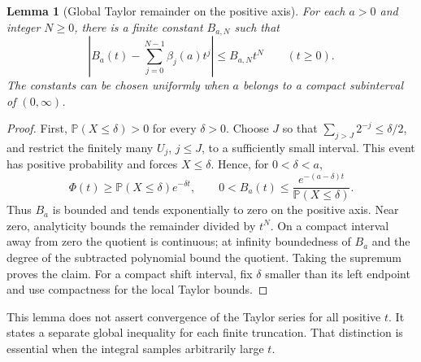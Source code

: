 \documentclass[11pt,a4paper,oneside,openany]{book}
\numberwithin{equation}{chapter}
\newtheorem{lemma}[theorem]{Lemma}
\theoremstyle{definition}
\theoremstyle{remark}
\newcommand{\abs}[1]{\left\lvert #1\right\rvert}
\begin{document}
\begin{lemma}[Global Taylor remainder on the positive axis]
\label{dc:lem:B-global}
For each $a>0$ and integer $N\ge0$, there is a finite constant
$B_{a,N}$ such that
\begin{equation}
 \abs{B_a(t)-\sum_{j=0}^{N-1}\beta_j(a)t^j}
 \le B_{a,N}t^N\qquad(t\ge0).
 \label{dc:eq:B-global}
\end{equation}
The constants can be chosen uniformly when $a$ belongs to a compact
subinterval of $(0,\infty)$.
\end{lemma}
\begin{proof}
First, $\mathbb P(X\le\delta)>0$ for every $\delta>0$.
Choose $J$ so that $\sum_{j>J}2^{-j}\le\delta/2$, and restrict the
finitely many $U_j$, $j\le J$, to a sufficiently small interval.
This event has positive probability and forces $X\le\delta$.
Hence, for $0<\delta<a$,
\[
 \Phi(t)\ge\mathbb P(X\le\delta)e^{-\delta t},\qquad
 0<B_a(t)\le\frac{e^{-(a-\delta)t}}{\mathbb P(X\le\delta)}.
\]
Thus $B_a$ is bounded and tends exponentially to zero on the positive
axis. Near zero, analyticity bounds the remainder divided by $t^N$.
On a compact interval away from zero the quotient is continuous;
at infinity boundedness of $B_a$ and the degree of the subtracted
polynomial bound the quotient. Taking the supremum proves the claim.
For a compact shift interval, fix $\delta$ smaller than its left
endpoint and use compactness for the local Taylor bounds.
\end{proof}

This lemma does not assert convergence of the Taylor series for all
positive $t$. It states a separate global inequality for each finite
truncation. That distinction is essential when the integral samples
arbitrarily large $t$.
\end{document}
